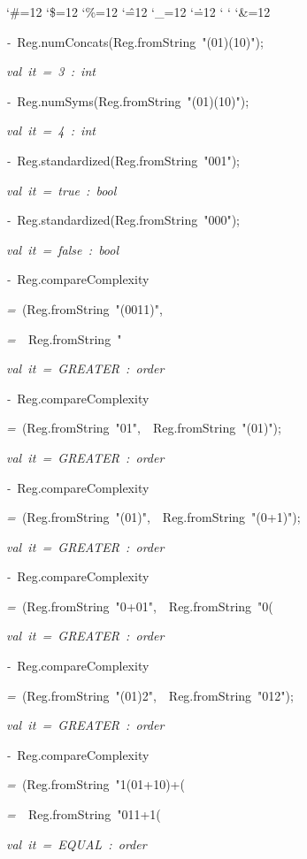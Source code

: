 \begin{list}{}
{\setlength{\leftmargin}{\leftmargini}
\setlength{\rightmargin}{0cm}
\setlength{\itemindent}{0cm}
\setlength{\listparindent}{0cm}
\setlength{\itemsep}{0cm}
\setlength{\parsep}{0cm}
\setlength{\labelsep}{0cm}
\setlength{\labelwidth}{0cm}
\catcode`\#=12
\catcode`\$=12
\catcode`\%=12
\catcode`\^=12
\catcode`\_=12
\catcode`\.=12
\catcode`
\catcode`
\catcode`\&=12
\ttfamily}
\small
\item[]\textsl{-\ }Reg.numConcats(Reg.fromString\ "(01)(10)");
\item[]\textsl{val\ it\ =\ 3\ :\ int}
\item[]\textsl{-\ }Reg.numSyms(Reg.fromString\ "(01)(10)");
\item[]\textsl{val\ it\ =\ 4\ :\ int}
\item[]\textsl{-\ }Reg.standardized(Reg.fromString\ "001");
\item[]\textsl{val\ it\ =\ true\ :\ bool}
\item[]\textsl{-\ }Reg.standardized(Reg.fromString\ "000");
\item[]\textsl{val\ it\ =\ false\ :\ bool}
\item[]\textsl{-\ }Reg.compareComplexity
\item[]\textsl{=\ }(Reg.fromString\ "(0011)",
\item[]\textsl{=\ }\ Reg.fromString\ "%
\item[]\textsl{val\ it\ =\ GREATER\ :\ order}
\item[]\textsl{-\ }Reg.compareComplexity
\item[]\textsl{=\ }(Reg.fromString\ "01",\ \ Reg.fromString\ "(01)");
\item[]\textsl{val\ it\ =\ GREATER\ :\ order}
\item[]\textsl{-\ }Reg.compareComplexity
\item[]\textsl{=\ }(Reg.fromString\ "(01)",\ \ Reg.fromString\ "(0+1)");
\item[]\textsl{val\ it\ =\ GREATER\ :\ order}
\item[]\textsl{-\ }Reg.compareComplexity
\item[]\textsl{=\ }(Reg.fromString\ "0+01",\ \ Reg.fromString\ "0(%
\item[]\textsl{val\ it\ =\ GREATER\ :\ order}
\item[]\textsl{-\ }Reg.compareComplexity
\item[]\textsl{=\ }(Reg.fromString\ "(01)2",\ \ Reg.fromString\ "012");
\item[]\textsl{val\ it\ =\ GREATER\ :\ order}
\item[]\textsl{-\ }Reg.compareComplexity
\item[]\textsl{=\ }(Reg.fromString\ "1(01+10)+(%
\item[]\textsl{=\ }\ Reg.fromString\ "011+1(%
\item[]\textsl{val\ it\ =\ EQUAL\ :\ order}
\end{list}

